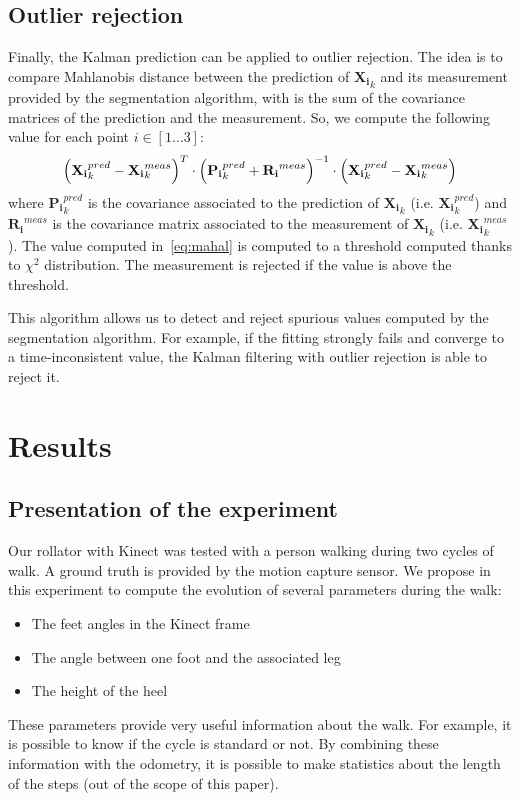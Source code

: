 \documentclass[letterpaper, 10 pt, conference]{ieeeconf}
\begin{document}
\subsection{Outlier rejection}
Finally, the Kalman  prediction can be applied to outlier rejection. The idea is to compare Mahlanobis distance between the prediction of $\mathbf{X_i}_k$ and its measurement provided by the segmentation algorithm, with is the sum of the covariance matrices of the prediction and the measurement. So, we compute the following value for each point $i\in[1\dots 3]$:
\begin{equation}
	\tiny
	\left(
		\mathbf{X_i}_k^{pred} - \mathbf{X_i}_k^{meas}
	\right)^T\cdot
	\left(
		\mathbf{P_i}_k^{pred} + \mathbf{R_i}^{meas}
	\right)^{-1}\cdot
	\left(
		\mathbf{X_i}_k^{pred} - \mathbf{X_i}_k^{meas}
	\right)
	\label{eq:mahal}
\end{equation}
where $\mathbf{P_i}_k^{pred}$ is the covariance associated to the prediction of $\mathbf{X_i}_k$ (i.e. $\mathbf{X_i}_k^{pred}$) and $\mathbf{R_i}^{meas}$ is the covariance matrix associated to the measurement of $\mathbf{X_i}_k$ (i.e. $\mathbf{X_i}_k^{meas}$). The value computed in~\ref{eq:mahal} is computed to a threshold computed thanks to $\chi^2$ distribution. The measurement is rejected if the value is above the threshold. 

This algorithm allows us to detect and reject spurious values computed by the segmentation algorithm. For example, if the fitting strongly fails and converge to a time-inconsistent value, the Kalman filtering with outlier rejection is able to reject it.
\section{Results}

\subsection{Presentation of the experiment}
Our rollator with Kinect was tested with a person walking during two cycles of walk. A ground truth is provided by the motion capture sensor. We propose in this experiment to compute the evolution of several parameters during the walk:
\begin{itemize}
	\item The feet angles in the Kinect frame
	\item The angle between one foot and the associated leg
	\item The height of the heel
\end{itemize}
These parameters provide very useful information about the walk. For example, it is possible to know if the cycle is standard or not. By combining these information with the odometry, it is possible to make statistics about the length of the steps (out of the scope of this paper).
\end{document}
